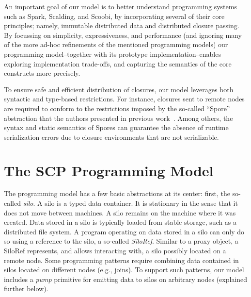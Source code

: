 \documentclass{easychair}
\begin{document}
An important goal of our model is to better understand programming systems such as Spark, Scalding, and
Scoobi, by incorporating several of their core principles; namely, immutable
distributed data and distributed closure passing. By focussing on simplicity,
expressiveness, and performance (and ignoring many of the more ad-hoc
refinements of the mentioned programming models) our
programming model--together with its prototype implementation--enables exploring
implementation trade-offs, and capturing the semantics of the core constructs more
precisely.


To ensure safe and efficient distribution of closures, our model leverages
both syntactic and type-based restrictions. For instance, closures sent to
remote nodes are required to conform to the restrictions imposed by the
so-called ``Spore'' abstraction that the authors presented in previous
work~\cite{MillerHO14}. Among others, the syntax and static semantics of
Spores can guarantee the absence of runtime serialization errors due to
closure environments that are not serializable.


\section{The SCP Programming Model}
\label{sec:model}


The programming model has a few basic abstractions at its center: first, the
so-called \emph{silo}. A silo is a typed data container. It is stationary in the
sense that it does not move between machines. A silo remains on the machine
where it was created. Data stored in a silo is typically loaded from stable
storage, such as a distributed file system. A program operating on data stored
in a silo can only do so using a reference to the silo, a so-called \emph{SiloRef}.
Similar to a proxy object, a SiloRef represents, and allows interacting with,
a silo possibly located on a remote node. Some programming patterns require
combining data contained in silos located on different nodes (e.g., joins). To
support such patterns, our model includes a \emph{pump} primitive for emitting
data to silos on arbitrary nodes (explained further below).
\end{document}
